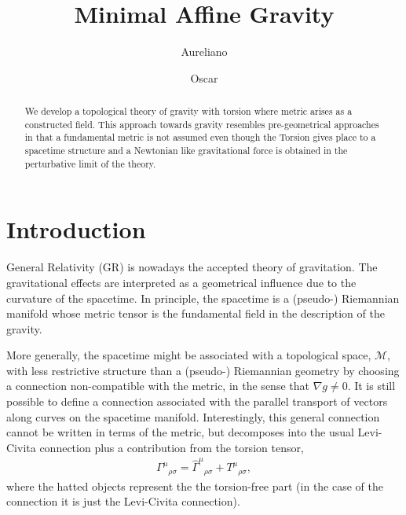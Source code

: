 \documentclass[%
  showpacs,showkeys,prd,superscriptaddress]{revtex4-1}
\begin{document}
\title{Minimal Affine Gravity}


\author{Aureliano }

\author{Oscar }

\begin{abstract}
We develop a topological theory of gravity with torsion where metric arises as a constructed field. This approach towards gravity resembles pre-geometrical approaches in that a fundamental metric is not assumed even though the Torsion gives place to a spacetime structure and a Newtonian like gravitational force is obtained in the perturbative limit of the theory.
\end{abstract}


\maketitle

\section{Introduction}

General Relativity (GR) is nowadays the accepted theory of gravitation. The gravitational effects are interpreted as a geometrical influence due to the curvature of the spacetime. In principle, the spacetime is a (pseudo-) Riemannian manifold whose metric tensor is the fundamental field in the description of the gravity.

More generally, the spacetime might be associated with a topological space, $\mathcal{M}$, with less restrictive structure than a (pseudo-) Riemannian geometry  by choosing a connection non-compatible with the metric, in the sense that $\nabla g\neq 0$. It is  still possible to define a connection associated with the parallel transport of vectors along curves on the spacetime manifold. Interestingly, this general connection cannot be written in terms of the metric, but decomposes into the usual Levi-Civita connection plus a contribution from the torsion tensor,
\begin{align}
  \Gamma^{\mu}{}_{\rho\sigma} = \hat{\Gamma}^{\mu}{}_{\rho\sigma} + T^{\mu}{}_{\rho\sigma},
\end{align}
where the hatted objects represent the the torsion-free part (in the case of the connection it is just the Levi-Civita connection).
\end{document}
